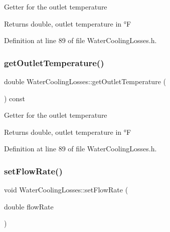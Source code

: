 Getter for the outlet temperature

\begin{DoxyReturn}{Returns}
double, outlet temperature in °F 
\end{DoxyReturn}


Definition at line 89 of file Water\+Cooling\+Losses.\+h.

\mbox{\label{class_water_cooling_losses_a79fb78755e813b2a3aa36ccd8ccebf7a}} 
\subsubsection{\texorpdfstring{get\+Outlet\+Temperature()}{getOutletTemperature()}\hspace{0.1cm}{\footnotesize\ttfamily [3/3]}}
{\footnotesize\ttfamily double Water\+Cooling\+Losses\+::get\+Outlet\+Temperature (\begin{DoxyParamCaption}{ }\end{DoxyParamCaption}) const\hspace{0.3cm}{\ttfamily [inline]}}

Getter for the outlet temperature

\begin{DoxyReturn}{Returns}
double, outlet temperature in °F 
\end{DoxyReturn}


Definition at line 89 of file Water\+Cooling\+Losses.\+h.

\mbox{\label{class_water_cooling_losses_abf4d64d9261818af331613791374d42f}} 
\subsubsection{\texorpdfstring{set\+Flow\+Rate()}{setFlowRate()}\hspace{0.1cm}{\footnotesize\ttfamily [1/3]}}
{\footnotesize\ttfamily void Water\+Cooling\+Losses\+::set\+Flow\+Rate (\begin{DoxyParamCaption}\item[{double}]{flow\+Rate }\end{DoxyParamCaption})\hspace{0.3cm}{\ttfamily [inline]}}

